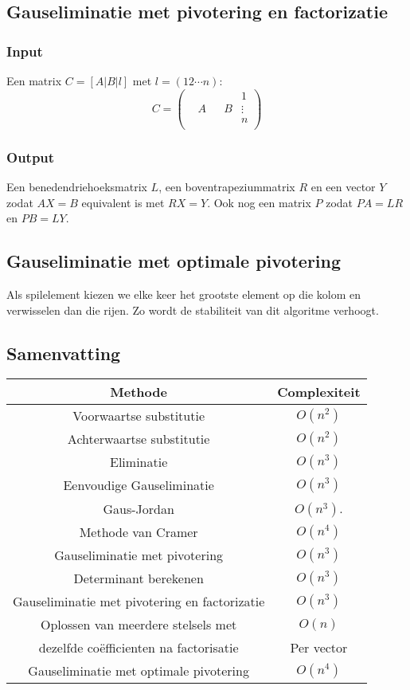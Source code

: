 \documentclass[samenvatting.tex]{subfiles}
\begin{document}
\subsection{Gauseliminatie met pivotering en factorizatie}
\subsubsection*{Input}
Een matrix $C = [A|B|l]$ met $ l = \left(1 2 \cdots n\right)$:
\[
C = 
\left(
\begin{array}{ccc|c|c}
 & & & &1\\
 &A& &B&\vdots\\
 & & & &n\\ 
\end{array}
\right)
\]

\subsubsection*{Output}
Een benedendriehoeksmatrix $L$, een boventrapeziummatrix $R$ en een vector $Y$ zodat $AX=B$ equivalent is met $RX = Y$. Ook nog een matrix $P$ zodat $PA = LR$ en $PB = LY$.

\subsection{Gauseliminatie met optimale pivotering}
Als spilelement kiezen we elke keer het grootste element op die kolom en verwisselen dan die rijen. Zo wordt de stabiliteit van dit algoritme verhoogt.

\subsection*{Samenvatting}
\begin{center}
\begin{tabular}{|c|c|}
\hline
Methode & Complexiteit\\
\hline
Voorwaartse substitutie & $O(n^2)$\\
Achterwaartse substitutie & $O(n^2)$\\
Eliminatie & $O(n^3)$\\
Eenvoudige Gauseliminatie & $O(n^3)$\\
Gaus-Jordan & $O(n^3)$.\\
Methode van Cramer & $O(n^4)$\\
Gauseliminatie met pivotering & $O(n^3)$\\
Determinant berekenen & $O(n^3)$\\
Gauseliminatie met pivotering en factorizatie & $O(n^3)$\\
Oplossen van meerdere stelsels met&$O(n)$\\ dezelfde co\"efficienten na factorisatie & Per vector\\
Gauseliminatie met optimale pivotering & $O(n^4)$\\
\hline
\end{tabular}
\end{center}
\end{document}
